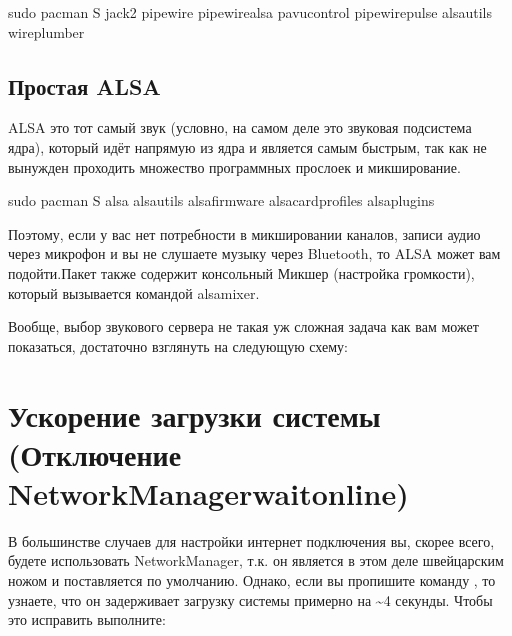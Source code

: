 \documentclass[letterpaper,10pt,russian,openany]{sphinxmanual}
\begin{document}
\begin{sphinxVerbatim}[commandchars=\\\{\}]
sudo pacman \PYGZhy{}S jack2 pipewire pipewire\PYGZhy{}alsa pavucontrol pipewire\PYGZhy{}pulse alsa\PYGZhy{}utils wireplumber
\end{sphinxVerbatim}

\ignorespaces 

\subsection{Простая ALSA}
\label{\detokenize{source/generic-system-acceleration:alsa}}\label{\detokenize{source/generic-system-acceleration:index-7}}\label{\detokenize{source/generic-system-acceleration:id5}}
\sphinxAtStartPar
ALSA \sphinxhyphen{} это тот самый звук (условно, на самом деле это звуковая подсистема ядра),
который идёт напрямую из ядра и является самым быстрым,
так как не вынужден проходить множество программных прослоек и микширование.

\begin{sphinxVerbatim}[commandchars=\\\{\}]
sudo pacman \PYGZhy{}S alsa alsa\PYGZhy{}utils alsa\PYGZhy{}firmware alsa\PYGZhy{}card\PYGZhy{}profiles alsa\PYGZhy{}plugins
\end{sphinxVerbatim}

\sphinxAtStartPar
Поэтому, если у вас нет потребности в микшировании каналов,
записи аудио через микрофон и вы не слушаете музыку через Bluetooth, то ALSA может вам подойти.Пакет  также содержит консольный Микшер (настройка громкости), который вызывается командой alsamixer.

\sphinxAtStartPar
Вообще, выбор звукового сервера не такая уж сложная задача как вам может показаться,
достаточно взглянуть на следующую схему:

\noindent{}

\ignorespaces 

\section{Ускорение загрузки системы (Отключение NetworkManager\sphinxhyphen{}wait\sphinxhyphen{}online)}
\label{\detokenize{source/generic-system-acceleration:networkmanager-wait-online}}\label{\detokenize{source/generic-system-acceleration:startup-acceleration}}\label{\detokenize{source/generic-system-acceleration:index-8}}
\sphinxAtStartPar
В большинстве случаев для настройки интернет подключения вы, скорее всего, будете использовать NetworkManager,
т.к. он является в этом деле швейцарским ножом и поставляется по умолчанию.
Однако, если вы пропишите команду , то узнаете, что он задерживает загрузку системы примерно на \textasciitilde{}4 секунды.
Чтобы это исправить выполните:
\end{document}
